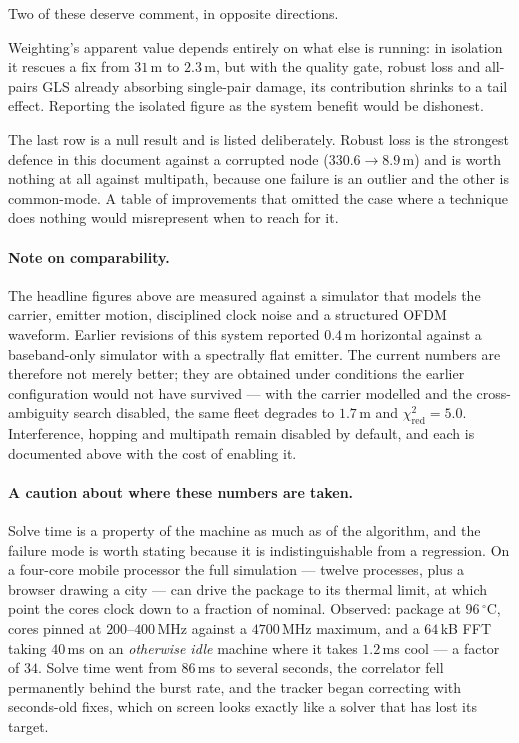 \documentclass[11pt,a4paper]{article}
\begin{document}
Two of these deserve comment, in opposite directions.

Weighting's apparent value depends entirely on what else is running: in
isolation it rescues a fix from $31$\,m to $2.3$\,m, but with the quality
gate, robust loss and all-pairs GLS already absorbing single-pair damage,
its contribution shrinks to a tail effect. Reporting the isolated figure as
the system benefit would be dishonest.

The last row is a null result and is listed deliberately. Robust loss is
the strongest defence in this document against a corrupted node
($330.6\to8.9$\,m) and is worth nothing at all against multipath, because
one failure is an outlier and the other is common-mode. A table of
improvements that omitted the case where a technique does nothing would
misrepresent when to reach for it.

\paragraph{Note on comparability.} The headline figures above are measured
against a simulator that models the carrier, emitter motion, disciplined
clock noise and a structured OFDM waveform. Earlier revisions of this
system reported $0.4$\,m horizontal against a baseband-only simulator with
a spectrally flat emitter. The current numbers are therefore not merely
better; they are obtained under conditions the earlier configuration would
not have survived --- with the carrier modelled and the cross-ambiguity
search disabled, the same fleet degrades to $1.7$\,m and
$\chi^2_{\text{red}}=5.0$. Interference, hopping and multipath remain
disabled by default, and each is documented above with the cost of
enabling it.

\paragraph{A caution about where these numbers are taken.} Solve time is a
property of the machine as much as of the algorithm, and the failure mode
is worth stating because it is indistinguishable from a regression. On a
four-core mobile processor the full simulation --- twelve processes, plus a
browser drawing a city --- can drive the package to its thermal limit, at
which point the cores clock down to a fraction of nominal. Observed:
package at $96\,^\circ$C, cores pinned at $200$--$400$\,MHz against a
$4700$\,MHz maximum, and a $64$\,kB FFT taking $40$\,ms on an
\emph{otherwise idle} machine where it takes $1.2$\,ms cool --- a factor of
$34$. Solve time went from $86$\,ms to several seconds, the correlator fell
permanently behind the burst rate, and the tracker began correcting with
seconds-old fixes, which on screen looks exactly like a solver that has
lost its target.
\end{document}

